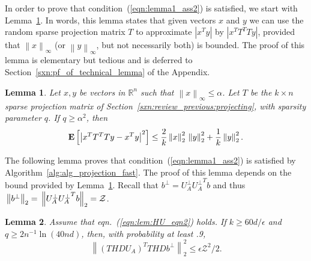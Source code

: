 \documentclass[11pt]{article}
\newcommand{\Expect}[1]{\mbox{}{\bf{E}}\left[#1\right]}
\newcommand{\VTTNorm }[1]{\mbox{}\left\|#1\right\|_2  }
\newcommand{\VTTNormS}[1]{\mbox{}\left\|#1\right\|_2^2}
\newcommand{\VINorm }[1]{\mbox{}\left\|#1\right\|_{\infty}  }
\newcommand{\abs }[1]{\left|#1\right|}
\newtheorem{lemma}{Lemma}
\begin{document}
In order to prove that condition~(\ref{eqn:lemma1_ass2}) is satisfied, we start with Lemma~\ref{lem:Tmatmult}. In words, this lemma states that given vectors $x$ and $y$ we can use the random sparse projection matrix $T$ to approximate $\abs{x^Ty}$ by $\abs{x^TT^{T}Ty}$, provided that $\VINorm{x}$ (or $\VINorm{y}$, but not necessarily both) is bounded. The proof of this lemma is elementary but tedious and is deferred to Section~\ref{sxn:pf_of_technical_lemma} of the Appendix.
\begin{lemma}
\label{lem:Tmatmult} Let $x,y$ be vectors in $\mathbb{R}^{n}$ such that $\VINorm{x} \le \alpha$. Let $T$ be the $k \times n$ sparse projection matrix of Section~\ref{sxn:review_previous:projecting}, with sparsity parameter $q$. If $q \ge \alpha^2$, then
$$
\Expect{ \abs{x^T T^T Ty-x^Ty}^{2} } \le \frac{2}{k} \VTTNormS{x} \VTTNormS{y} + \frac{1}{k} \VTTNormS{y}.
$$
\end{lemma}
\noindent The following lemma proves that condition~(\ref{eqn:lemma1_ass2}) is satisfied by Algorithm~\ref{alg:alg_projection_fast}. The proof of this lemma depends on the bound provided by Lemma~\ref{lem:Tmatmult}. Recall that $b^{\perp} = U_A^{\perp}{U_A^{\perp}}^{T}b$ and thus $\VTTNorm{b^{\perp}} = \VTTNorm{U_A^{\perp}{U_A^{\perp}}^{T}b} = {\cal Z}$.
\begin{lemma} \label{lem:project_lem40pf}
Assume that eqn.~(\ref{eqn:lem:HU_eqn2}) holds. If $k\geq 60 d/\epsilon$ and $q \geq 2n^{-1} \ln(40nd)$, then, with probability at least .9, $$ \VTTNormS{\left(THDU_A\right)^{T}THDb^{\perp}} \leq \epsilon \mathcal{Z}^{2}/2.$$
\end{lemma}
\end{document}
